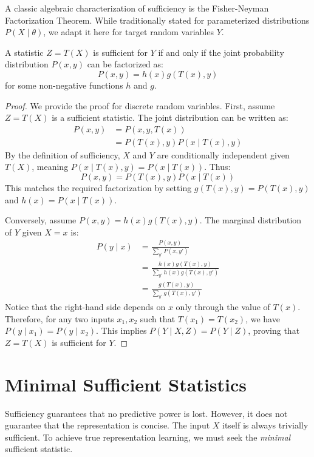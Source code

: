 A classic algebraic characterization of sufficiency is the Fisher-Neyman Factorization Theorem. While traditionally stated for parameterized distributions $P(X \mid \theta)$, we adapt it here for target random variables $Y$.

\begin{theorem}
\label{thm:fisher_neyman}
A statistic $Z = T(X)$ is sufficient for $Y$ if and only if the joint probability distribution $P(x, y)$ can be factorized as:
\[ P(x, y) = h(x) g(T(x), y) \]
for some non-negative functions $h$ and $g$.
\end{theorem}
\begin{proof}
We provide the proof for discrete random variables. 
First, assume $Z = T(X)$ is a sufficient statistic. The joint distribution can be written as:
\begin{align*}
P(x, y) &= P(x, y, T(x)) \\
&= P(T(x), y) P(x \mid T(x), y)
\end{align*}
By the definition of sufficiency, $X$ and $Y$ are conditionally independent given $T(X)$, meaning $P(x \mid T(x), y) = P(x \mid T(x))$. Thus:
\[ P(x, y) = P(T(x), y) P(x \mid T(x)) \]
This matches the required factorization by setting $g(T(x), y) = P(T(x), y)$ and $h(x) = P(x \mid T(x))$.

Conversely, assume $P(x, y) = h(x) g(T(x), y)$. The marginal distribution of $Y$ given $X=x$ is:
\begin{align*}
P(y \mid x) &= \frac{P(x, y)}{\sum_{y'} P(x, y')} \\
&= \frac{h(x) g(T(x), y)}{\sum_{y'} h(x) g(T(x), y')} \\
&= \frac{g(T(x), y)}{\sum_{y'} g(T(x), y')}
\end{align*}
Notice that the right-hand side depends on $x$ only through the value of $T(x)$. Therefore, for any two inputs $x_1, x_2$ such that $T(x_1) = T(x_2)$, we have $P(y \mid x_1) = P(y \mid x_2)$. This implies $P(Y \mid X, Z) = P(Y \mid Z)$, proving that $Z = T(X)$ is sufficient for $Y$.
\end{proof}

\section{Minimal Sufficient Statistics}

Sufficiency guarantees that no predictive power is lost. However, it does not guarantee that the representation is concise. The input $X$ itself is always trivially sufficient. To achieve true representation learning, we must seek the \emph{minimal} sufficient statistic.

